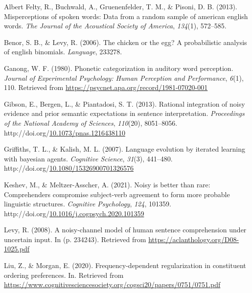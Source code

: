 \documentclass[10pt, letterpaper]{article}
\newenvironment{CSLReferences}%
  {}%
  {\par}
\begin{document}
\hypertarget{refs}{}
\begin{CSLReferences}{1}{0}
\leavevmode{}%
Albert Felty, R., Buchwald, A., Gruenenfelder, T. M., \& Pisoni, D. B.
(2013). Misperceptions of spoken words: Data from a random sample of
american english words. \emph{The Journal of the Acoustical Society of
America}, \emph{134}(1), 572--585.

\leavevmode{}%
Benor, S. B., \& Levy, R. (2006). The chicken or the egg? A
probabilistic analysis of english binomials. \emph{Language}, 233278.

\leavevmode{}%
Ganong, W. F. (1980). Phonetic categorization in auditory word
perception. \emph{Journal of Experimental Psychology: Human Perception
and Performance}, \emph{6}(1), 110. Retrieved from
\url{https://psycnet.apa.org/record/1981-07020-001}

\leavevmode{}%
Gibson, E., Bergen, L., \& Piantadosi, S. T. (2013). Rational
integration of noisy evidence and prior semantic expectations in
sentence interpretation. \emph{Proceedings of the National Academy of
Sciences}, \emph{110}(20), 8051--8056.
http://doi.org/\href{https://doi.org/10.1073/pnas.1216438110}{10.1073/pnas.1216438110}

\leavevmode{}%
Griffiths, T. L., \& Kalish, M. L. (2007). Language evolution by
iterated learning with bayesian agents. \emph{Cognitive Science},
\emph{31}(3), 441--480.
http://doi.org/\href{https://doi.org/10.1080/15326900701326576}{10.1080/15326900701326576}

\leavevmode{}%
Keshev, M., \& Meltzer-Asscher, A. (2021). Noisy is better than rare:
Comprehenders compromise subject-verb agreement to form more probable
linguistic structures. \emph{Cognitive Psychology}, \emph{124}, 101359.
http://doi.org/\href{https://doi.org/10.1016/j.cogpsych.2020.101359}{10.1016/j.cogpsych.2020.101359}

\leavevmode{}%
Levy, R. (2008). A noisy-channel model of human sentence comprehension
under uncertain input. In (p. 234243). Retrieved from
\url{https://aclanthology.org/D08-1025.pdf}

\leavevmode{}%
Liu, Z., \& Morgan, E. (2020). Frequency-dependent regularization in
constituent ordering preferences. In. Retrieved from
\url{https://www.cognitivesciencesociety.org/cogsci20/papers/0751/0751.pdf}


\end{CSLReferences}
\end{document}
